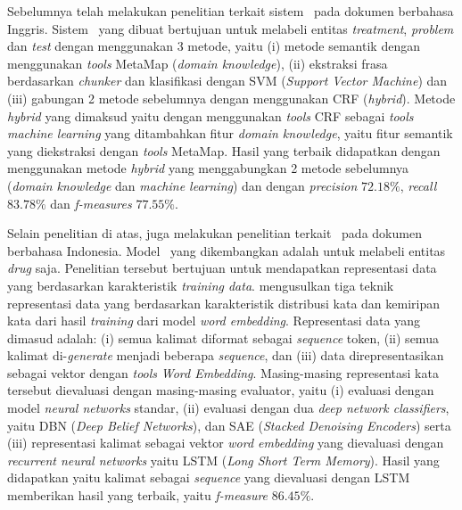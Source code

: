 Sebelumnya \cite{abacha2011medical} telah melakukan penelitian terkait sistem \mer~pada dokumen berbahasa Inggris. Sistem \mer~yang dibuat bertujuan untuk melabeli entitas \textit{treatment}, \textit{problem} dan \textit{test} dengan menggunakan 3 metode, yaitu (i) metode semantik dengan menggunakan \textit{tools} MetaMap (\textit{domain knowledge}), (ii) ekstraksi frasa berdasarkan \textit{chunker} dan klasifikasi dengan SVM (\textit{Support Vector Machine}) dan (iii) gabungan 2 metode sebelumnya dengan menggunakan CRF (\textit{hybrid}). Metode \textit{hybrid} yang dimaksud yaitu dengan menggunakan \textit{tools} CRF sebagai \textit{tools machine learning} yang ditambahkan fitur \textit{domain knowledge}, yaitu fitur semantik yang diekstraksi dengan \textit{tools} MetaMap. Hasil yang terbaik didapatkan dengan menggunakan metode \textit{hybrid} yang menggabungkan 2 metode sebelumnya (\textit{domain knowledge} dan \textit{machine learning}) dan dengan \textit{precision} $ 72.18\% $, \textit{recall} $ 83.78\% $ dan \textit{f-measures} $ 77.55\% $.

Selain penelitian di atas, \cite{mujiono2016new} juga melakukan penelitian terkait \mer~pada dokumen berbahasa Indonesia. Model \mer~yang dikembangkan adalah untuk melabeli entitas \textit{drug} saja. Penelitian tersebut bertujuan untuk mendapatkan representasi data yang berdasarkan karakteristik \textit{training data}. \cite{mujiono2016new} mengusulkan tiga teknik representasi data yang berdasarkan karakteristik distribusi kata dan kemiripan kata dari hasil \textit{training} dari model \textit{word embedding}. Representasi data yang dimasud adalah: (i) semua kalimat diformat sebagai \textit{sequence} token, (ii) semua kalimat di-\textit{generate} menjadi beberapa \textit{sequence}, dan (iii) data direpresentasikan sebagai vektor dengan \textit{tools} \textit{Word Embedding}. Masing-masing representasi kata tersebut dievaluasi dengan masing-masing evaluator, yaitu (i) evaluasi dengan model \textit{neural networks} standar, (ii) evaluasi dengan dua \textit{deep network classifiers}, yaitu DBN (\textit{Deep Belief Networks}), dan SAE (\textit{Stacked Denoising Encoders}) serta (iii) representasi kalimat sebagai vektor \textit{word embedding} yang dievaluasi dengan \textit{recurrent neural networks} yaitu LSTM (\textit{Long Short Term Memory}). Hasil yang didapatkan yaitu kalimat sebagai \textit{sequence} yang dievaluasi dengan LSTM memberikan hasil yang terbaik, yaitu \textit{f-measure} $ 86.45\% $.

